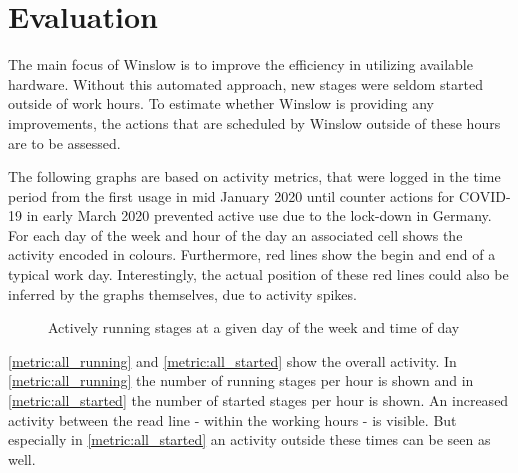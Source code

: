 \section{Evaluation}

The main focus of Winslow is to improve the efficiency in utilizing available hardware.
Without this automated approach, new stages were seldom started outside of work hours.
To estimate whether Winslow is providing any improvements, the actions that are scheduled by Winslow outside of these hours are to be assessed.

The following graphs are based on activity metrics, that were logged in the time period from the first usage in mid January 2020 until counter actions for COVID-19 in early March 2020 prevented active use due to the lock-down in Germany.
For each day of the week and hour of the day an associated cell shows the activity encoded in colours.
Furthermore, red lines show the begin and end of a typical work day.
Interestingly, the actual position of these red lines could also be inferred by the graphs themselves, due to activity spikes.


\begin{figure}[H]
	\centering
	\caption{Actively running stages at a given day of the week and time of day}
	\label{metric:all_running}
\end{figure}

\autoref{metric:all_running} and \autoref{metric:all_started} show the overall activity.
In \autoref{metric:all_running} the number of running stages per hour is shown and in \autoref{metric:all_started} the number of started stages per hour is shown.
An increased activity between the read line - within the working hours - is visible.
But especially in \autoref{metric:all_started} an activity outside these times can be seen as well.

